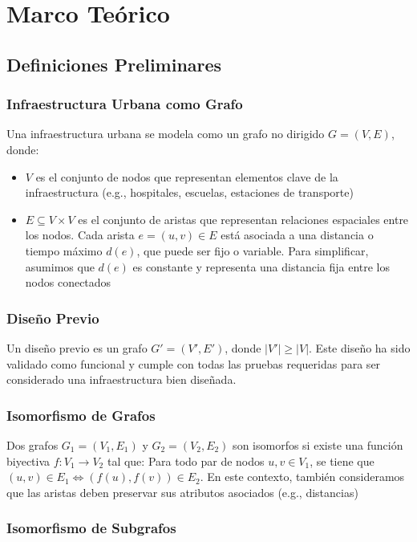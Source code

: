 \documentclass[12pt,a4paper]{article}
\begin{document}
\section{Marco Teórico}
\subsection{Definiciones Preliminares}

\subsubsection{Infraestructura Urbana como Grafo}

Una infraestructura urbana se modela como un grafo no dirigido $G=(V,E)$, donde:
\begin{itemize}
    \item $V$ es el conjunto de nodos que representan elementos clave de la infraestructura (e.g., hospitales, escuelas, estaciones de transporte)
    \item $E \subseteq V\times V$ es el conjunto de aristas que representan relaciones espaciales entre los nodos. Cada arista $e=(u,v)\in E$ está asociada a una distancia o tiempo máximo $d(e)$, que puede ser fijo o variable. Para simplificar, asumimos que $d(e)$ es constante y representa una distancia fija entre los nodos conectados
\end{itemize}

\subsubsection{Diseño Previo}

Un diseño previo es un grafo $G'=(V',E')$, donde $\lvert V'\rvert \geq \lvert V\rvert$. Este diseño ha sido validado como funcional y cumple con todas las pruebas requeridas para ser considerado una infraestructura bien diseñada.

\subsubsection{Isomorfismo de Grafos}

Dos grafos $G_1=(V_1,E_1)$ y $G_2=(V_2,E_2)$ son isomorfos si existe una función biyectiva $f:V_1\to V_2$ tal que:
Para todo par de nodos $u,v\in V_1$, se tiene que $(u,v)\in E_1 \Longleftrightarrow (f(u),f(v))\in E_2$.
En este contexto, también consideramos que las aristas deben preservar sus atributos asociados (e.g., distancias)

\subsubsection{Isomorfismo de Subgrafos}
\end{document}
